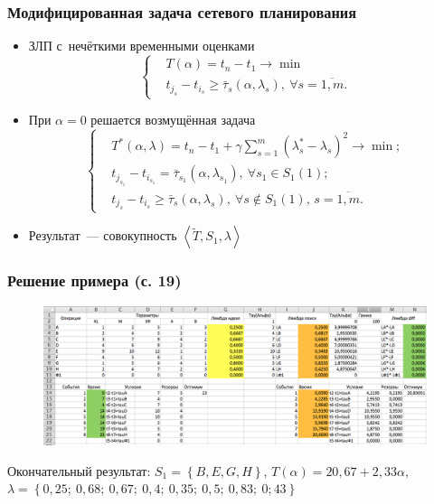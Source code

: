 \documentclass[12pt]{beamer}
\begin{document}

\begin{frame}
  \frametitle{Модифицированная задача сетевого планирования}
  \begin{itemize}
    \item ЗЛП с~нечёткими временными оценками
      \begin{equation}
      \label{eq:modified-fcpm-lp}
        \left\{ \begin{aligned}
          & T(\alpha )=t_n-t_1\to \min  \\ 
          & t_{j_s}-t_{i_s}\geqslant \bar{\tau}_s\left(\alpha,\lambda_s \right),\ \forall s=\overline{1,m}.
        \end{aligned} \right.
      \end{equation}
    \item При $\alpha = 0$ решается возмущённая задача
      \begin{equation}
      \label{eq:modified-fcpm-lp-alpha}
        \left \{ \begin{aligned}
          & T^* \left(\alpha, \lambda \right) = t_n-t_1+\gamma \sum \limits_{s=1}^{m} \left(\lambda_s^*-\lambda_s \right)^2 \to \min; \\
          & t_{j_{s_1}}-t_{i_{s_1}} = \bar{\tau}_{s_1}\left(\alpha, \lambda_{s_1} \right),\ \forall s_1 \in S_1\left(1\right); \\
          & t_{j_s}-t_{i_s} \geqslant \bar{\tau}_s\left(\alpha, \lambda_s \right),\ \forall s \notin S_1\left(1\right),\,s=\overline{1,m}.
        \end{aligned} \right.
      \end{equation}
    \item Результат~--- совокупность $\left \langle \tilde T, S_1, \lambda \right \rangle$
  \end{itemize}
\end{frame}


\begin{frame}
  \frametitle{Решение примера (с. 19)}
  \begin{figure}
    \center
    \includegraphics[width=\textwidth]{excel-screen.png}
  \end{figure}
  Окончательный результат: $S_1=\left\{ B,E,G,H \right\}$, $T\left( \alpha \right)=20,67+2,33\alpha$, $\lambda =\left\{ 0,25;\ 0,68;\ 0,67;\ 0,4;\ 0,35;\ 0,5;\ 0,83;\ 0;43 \right\}$
\end{frame}
\end{document}
